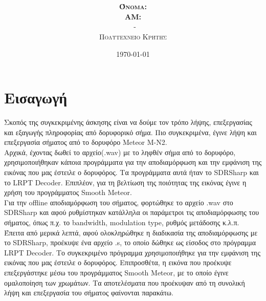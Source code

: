 \documentclass{article}
\title{\underline{\textbf{\assignmentNumber}}}
\author{\textsc{\textbf{Όνομα:}}  \studentName\\
		\textsc{\textbf{ΑΜ:}}  \studentNumber\\
		\course \ - \courseName\\ 
		\textsc{Πολυτεχνείο Κρήτης}
}
\date{\today}
\begin{document}
	\maketitle
\section{Εισαγωγή}
Σκοπός της συγκεκριμένης άσκησης είναι να δούμε τον τρόπο λήψης, επεξεργασίας και εξαγωγής πληροφορίας από δορυφορικό σήμα. Πιο συγκεκριμένα, έγινε λήψη και επεξεργασία σήματος από το δορυφόρο Meteor M-N2.\\

\noindent
Αρχικά, έχοντας δωθεί το αρχείο(.wav) με το ληφθέν σήμα από το δορυφόρο, χρησιμοποιήθηκαν κάποια προγράμματα για την αποδιαμόρφωση και την εμφάνιση της εικόνας που μας έστειλε ο δορυφόρος. Τα προγράμματα αυτά ήταν το SDRSharp και το LRPT Decoder. Επιπλέον, για τη βελτίωση της ποιότητας της εικόνας έγινε η χρήση του προγράμματος Smooth Meteor.\\

\noindent
Για την offline αποδιαμόρφωση του σήματος, φορτώθηκε το αρχείο .wav στο SDRSharp και αφού ρυθμίστηκαν κατάλληλα οι παράμετροι τις αποδιαμόρφωσης του σήματος, όπως π.χ. το bandwidth, modulation type, ρυθμός μετάδοσης κ.λ.π.\\

\noindent
Έπειτα από μερικά λεπτά, αφού ολοκληρώθηκε η διαδικασία της αποδιαμόρφωσης με το SDRSharp, προέκυψε ένα αρχείο .s, το οποίο δώθηκε ως είσοδος στο πρόγραμμα LRPT Decoder. Το συγκεκριμένο πρόγραμμα χρησιμοποιήθηκε για την εμφάνιση της εικόνας που μας έστειλε ο δορυφόρος. Επιπροσθέτα, η εικόνα που προέκυψε επεξεργάστηκε μέσω του προγράμματος Smooth Meteor, με το οποίο έγινε ομαλοποίηση των χρωμάτων. Τα αποτελέσματα που προέκυψαν από τη συνολική λήψη και επεξεργασία του σήματος φαίνονται παρακάτω.  
\end{document}
